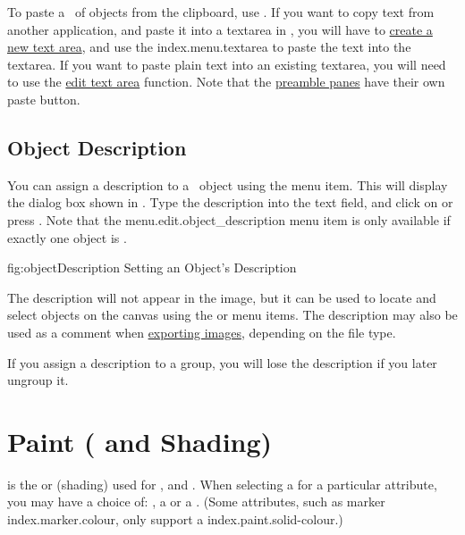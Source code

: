 
To paste a \selection\ of \glspl{object} from the clipboard, use
. If you want to copy text from another
application, and paste it into a \gls{textarea} in \FlowframTk, you
will have to \hyperref[sec:newtext]{create a new text area}, and
use the \gls{index.menu.textarea} to paste the text into the
\gls*{textarea}.  If you want to paste plain text into an existing
\gls*{textarea}, you will need to use the
\hyperref[sec:edittext]{edit text area} function.  Note that the
\hyperref[sec:preamble]{preamble panes} have their own paste button.

\section{Object Description}\label{sec:objectdescription}


You can assign a description to a \selected\ \gls*{object} using the
 menu item. This will display the
dialog box shown in . Type the
description into the text field, and click on  or press
.  Note that the \gls{menu.edit.object_description}
menu item is only available if exactly one object is \selected.

\FloatFig
  {fig:objectDescription}
  {}
  {Setting an Object's Description}

The description will not appear in the image, but it can be used to
locate and select \glspl*{object} on the canvas using the
 or
 menu items. The description
may also be used as a comment when
\hyperref[sec:exportimage]{exporting images}, depending on the
file type.

\begin{important}
If you assign a description to a \gls{group},
you will lose the description if you later ungroup it.
\end{important}

\chapter{Paint ( and Shading)}
\label{sec:paintcolourandshading}

 is the  or
 (shading) used for
,  and . When selecting a
 for a particular attribute, you may have a choice of:
, a  or a .
(Some attributes, such as marker \gls{index.marker.colour},
only support a \gls{index.paint.solid-colour}.)

